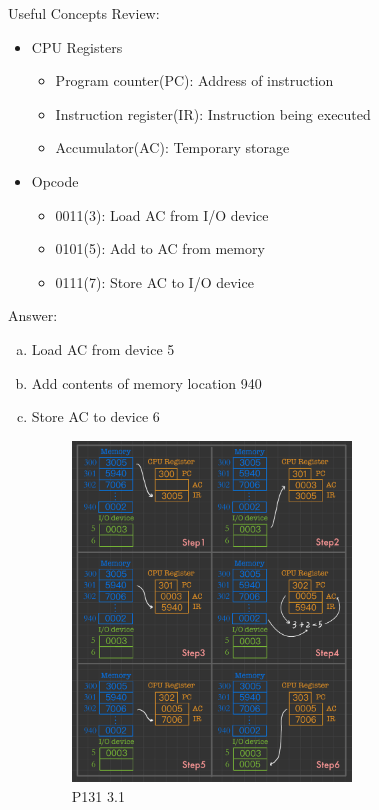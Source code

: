 \documentclass[11pt]{article}  %
\begin{document}
    Useful Concepts Review: 
    \begin{itemize}
        \item CPU Registers
            \begin{itemize}
                \item Program counter(PC): Address of instruction
                \item Instruction register(IR): Instruction being executed
                \item Accumulator(AC): Temporary storage
            \end{itemize}
        \item Opcode
            \begin{itemize}
                \item 0011(3): Load AC from I/O device
                \item 0101(5): Add to AC from memory
                \item 0111(7): Store AC to I/O device
            \end{itemize}
    \end{itemize}
    Answer:
    \begin{enumerate}[a.]
        \item Load AC from device 5
        \item Add contents of memory location 940
        \item Store AC to device 6
        \begin{figure}[H]
            \centering
            \includegraphics[width=0.7\textwidth]{pic/p1.pdf}
            \caption{P131 3.1}
        \end{figure}
    \end{enumerate}
\end{document}
